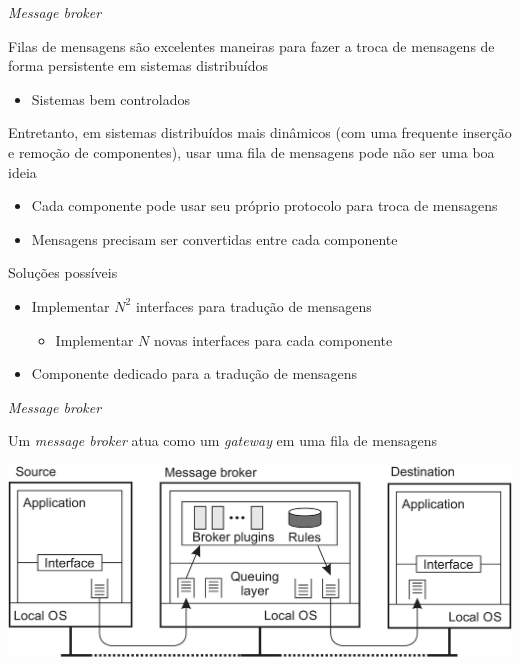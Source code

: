 \documentclass[compress]{beamer}
\begin{document}
\begin{frame}{\textit{Message broker}}

Filas de mensagens são excelentes maneiras para fazer a troca de mensagens de forma persistente em sistemas distribuídos
\begin{itemize}
    \item Sistemas bem controlados
\end{itemize}

\vspace{0.25cm}

Entretanto, em sistemas distribuídos mais dinâmicos (com uma frequente inserção e remoção de componentes), usar uma fila de mensagens pode não ser uma boa ideia
\begin{itemize}
    \item Cada componente pode usar seu próprio protocolo para troca de mensagens
    \item Mensagens precisam ser convertidas entre cada componente
\end{itemize}

\vspace{0.25cm}

Soluções possíveis
\begin{itemize}
    \item Implementar $N^2$ interfaces para tradução de mensagens
    \begin{itemize}
        \item Implementar $N$ novas interfaces para cada componente
    \end{itemize}
    \item Componente dedicado para a tradução de mensagens
\end{itemize}
\end{frame}


\begin{frame}{\textit{Message broker}}

Um \textit{message broker} atua como um \textit{gateway} em uma fila de mensagens

\vspace{0.5cm}

\centering \includegraphics[width=\textwidth]{images/broker.png}
\end{frame}
\end{document}

